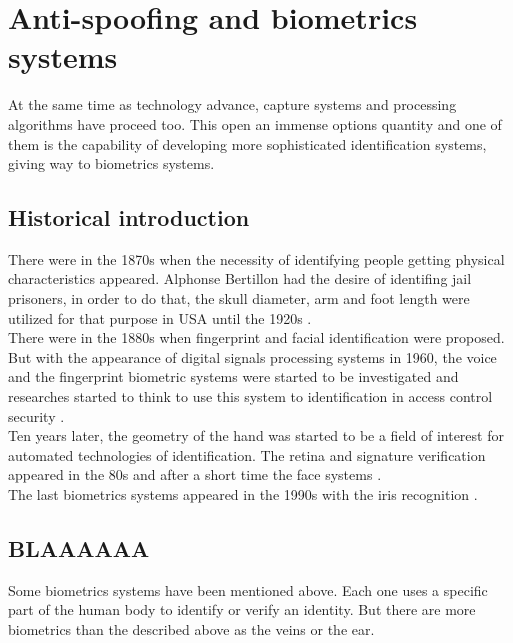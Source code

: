 \section{Anti-spoofing and biometrics systems}
At the same time as technology advance, capture systems and processing algorithms have proceed too. This open an immense options quantity and one of them is the capability of developing more sophisticated identification systems, giving way to biometrics systems.\\

\subsection{Historical introduction}
There were in the 1870s when the necessity of identifying people getting physical characteristics appeared. Alphonse Bertillon had the desire of identifing jail prisoners, in order to do that, the skull diameter, arm and foot length were utilized for that purpose in USA until the 1920s \cite{Intro_biometrics}.\\

 There were in the 1880s when fingerprint and facial identification were proposed. But with the appearance of digital signals processing systems in 1960, the voice and the fingerprint biometric systems were started to be investigated and researches started to think to use this system to identification in access control security \cite{Intro_biometrics}.\\
 
Ten years later, the geometry of the hand was started to be a field of interest for automated technologies of identification. The retina and signature verification appeared in the 80s and after a short time the face systems \cite{Intro_biometrics}.\\

 The last biometrics systems appeared in the 1990s with the iris recognition \cite{Intro_biometrics}.\\

\subsection{BLAAAAAA}
Some biometrics systems have been mentioned above. Each one uses a specific part of the human body to identify or verify an identity. But there are more biometrics than the described above as the veins or the ear.\\

